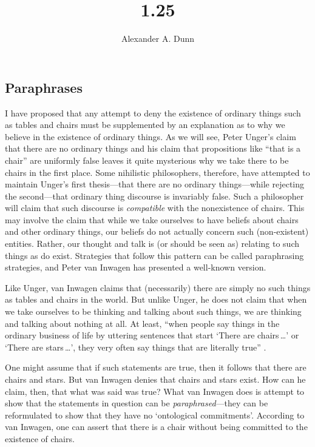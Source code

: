 \documentclass[11pt]{standalone}
\title{1.25}
\author{Alexander A. Dunn}
\begin{document}
\ifstandalone
\maketitle
\begin{spacing}{1.5}
\fi

\section{Paraphrases}
I have proposed that any attempt to deny the existence of ordinary
things such as tables and chairs must be supplemented by an
explanation as to why we believe in the existence of ordinary things.
As we will see, Peter Unger's claim that there are no ordinary things
and his claim that propositions like ``that is a chair'' are uniformly
false leaves it quite mysterious why we take there to be chairs in the
first place.  Some nihilistic philosophers, therefore, have attempted
to maintain Unger's first thesis---that there are no ordinary
things---while rejecting the second---that ordinary thing discourse is
invariably false.  Such a philosopher will claim that such discourse
is {\em compatible} with the nonexistence of chairs.  This may involve
the claim that while we take ourselves to have beliefs about chairs
and other ordinary things, our beliefs do not actually concern such
(non-existent) entities.  Rather, our thought and talk is (or should
be seen as) relating to such things as do exist.  Strategies that
follow this pattern can be called paraphrasing strategies, and Peter
van Inwagen has presented a well-known version.

Like Unger, van Inwagen claims that (necessarily) there are simply no
such things as tables and chairs in the world.  But unlike Unger, he
does not claim that when we take ourselves to be thinking and talking
about such things, we are thinking and talking about nothing at all.
At least, ``when people say things in the ordinary business of life by
uttering sentences that start `There are chairs\,\ldots ' or `There
are stars\,\ldots ', they very often say things that are literally
true'' \citep[102]{inwagen1995}.  

One might assume that if such statements are true, then it follows
that there are chairs and stars.  But van Inwagen denies that chairs
and stars exist.  How can he claim, then, that what was said was true?
What van Inwagen does is attempt to show that the statements in
question can be {\em paraphrased}---they can be reformulated to show
that they have no `ontological commitments'.  According to van
Inwagen, one can assert that there is a chair without being committed
to the existence of chairs.


\end{spacing}
\end{document}
